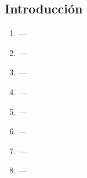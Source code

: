 \subsection{Introducción}

\begin{enumerate}
\item  ---
\item  ---
\item  ---
\item  ---
\item  ---
\item  ---
\item  ---
\item  ---

\end{enumerate}
